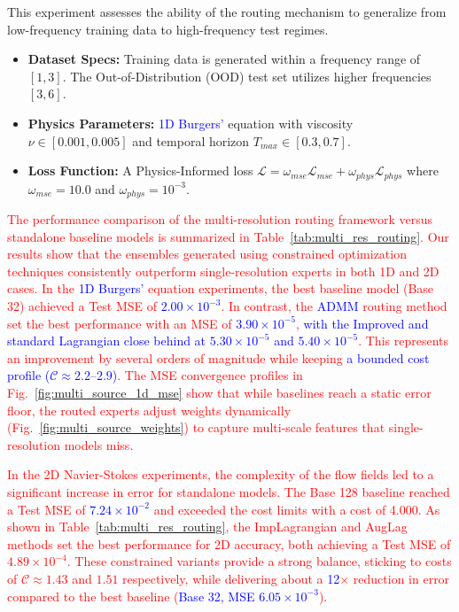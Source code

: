 \documentclass[preprint,12pt,authoryear]{elsarticle}
\begin{document}
This experiment assesses the ability of the routing mechanism to generalize from low-frequency training data to high-frequency test regimes.

\begin{itemize}
    \item \textbf{Dataset Specs:} Training data is generated within a frequency range of $[1, 3]$. The Out-of-Distribution (OOD) test set utilizes higher frequencies $[3, 6]$.
    \item \textbf{Physics Parameters:} \textcolor{blue}{1D Burgers'} equation with viscosity $\nu \in [0.001, 0.005]$ and temporal horizon $T_{max} \in [0.3, 0.7]$.
    \item \textbf{Loss Function:} A Physics-Informed loss $\mathcal{L} = \omega_{mse} \mathcal{L}_{mse} + \omega_{phys} \mathcal{L}_{phys}$ where $\omega_{mse} = 10.0$ and $\omega_{phys} = 10^{-3}$.
\end{itemize}

\textcolor{red}{The performance comparison of the multi-resolution routing framework versus standalone baseline models is summarized in Table~\ref{tab:multi_res_routing}. Our results show that the ensembles generated using constrained optimization techniques consistently outperform single-resolution experts in both 1D and 2D cases. In the \textcolor{blue}{1D Burgers'} equation experiments, the best baseline model (Base 32) achieved a Test MSE of \textcolor{blue}{$2.00 \times 10^{-3}$}. In contrast, the \textcolor{blue}{ADMM} routing method set the best performance with an MSE of \textcolor{blue}{$3.90 \times 10^{-5}$}, \textcolor{blue}{with the Improved and standard Lagrangian close behind at $5.30 \times 10^{-5}$ and $5.40 \times 10^{-5}$}. This represents an improvement by several orders of magnitude while keeping \textcolor{blue}{a bounded cost profile ($\mathcal{C} \approx 2.2$--$2.9$)}. The MSE convergence profiles in Fig.~\ref{fig:multi_source_1d_mse} show that while baselines reach a static error floor, the routed experts adjust weights dynamically (Fig.~\ref{fig:multi_source_weights}) to capture multi-scale features that single-resolution models miss.}

\textcolor{red}{In the 2D Navier-Stokes experiments, the complexity of the flow fields led to a significant increase in error for standalone models. The Base 128 baseline reached a Test MSE of \textcolor{blue}{$7.24 \times 10^{-2}$} and exceeded the cost limits with a cost of 4.000. As shown in Table~\ref{tab:multi_res_routing}, the ImpLagrangian and AugLag methods set the best performance for 2D accuracy, both achieving a Test MSE of $4.89 \times 10^{-4}$. These constrained variants provide a strong balance, sticking to costs of $\mathcal{C} \approx 1.43$ and $1.51$ respectively, while delivering about a \textcolor{blue}{12}$\times$ reduction in error compared to the best baseline (\textcolor{blue}{Base 32, MSE $6.05 \times 10^{-3}$}).}
\end{document}
